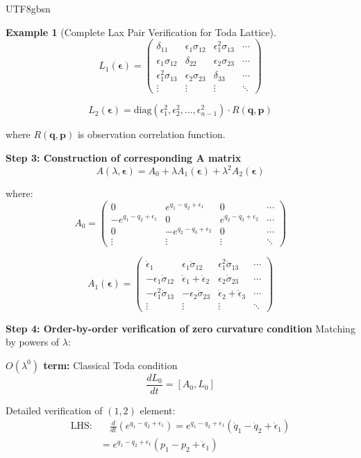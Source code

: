 \documentclass[a4paper,12pt]{extarticle}
\theoremstyle{definition}
\newtheorem{example}{Example}
\begin{document}
\begin{CJK}{UTF8}{gbsn}
\begin{example}[Complete Lax Pair Verification for Toda Lattice]
$$L_1(\boldsymbol{\epsilon}) = \begin{pmatrix}
\delta_{11} & \epsilon_1\sigma_{12} & \epsilon_1^2\sigma_{13} & \cdots \\
\epsilon_1\sigma_{12} & \delta_{22} & \epsilon_2\sigma_{23} & \cdots \\
\epsilon_1^2\sigma_{13} & \epsilon_2\sigma_{23} & \delta_{33} & \cdots \\
\vdots & \vdots & \vdots & \ddots
\end{pmatrix}$$

$$L_2(\boldsymbol{\epsilon}) = \text{diag}(\epsilon_1^2, \epsilon_2^2, \ldots, \epsilon_{n-1}^2) \cdot R(\boldsymbol{q}, \boldsymbol{p})$$

where $R(\boldsymbol{q}, \boldsymbol{p})$ is observation correlation function.

\textbf{Step 3: Construction of corresponding A matrix}
$$A(\lambda, \boldsymbol{\epsilon}) = A_0 + \lambda A_1(\boldsymbol{\epsilon}) + \lambda^2 A_2(\boldsymbol{\epsilon})$$

where:
$$A_0 = \begin{pmatrix}
0 & e^{q_1-q_2+\epsilon_1} & 0 & \cdots \\
-e^{q_1-q_2+\epsilon_1} & 0 & e^{q_2-q_3+\epsilon_2} & \cdots \\
0 & -e^{q_2-q_3+\epsilon_2} & 0 & \cdots \\
\vdots & \vdots & \vdots & \ddots
\end{pmatrix}$$

$$A_1(\boldsymbol{\epsilon}) = \begin{pmatrix}
\dot{\epsilon}_1 & \epsilon_1\dot{\sigma}_{12} & \epsilon_1^2\dot{\sigma}_{13} & \cdots \\
-\epsilon_1\dot{\sigma}_{12} & \dot{\epsilon}_1 + \dot{\epsilon}_2 & \epsilon_2\dot{\sigma}_{23} & \cdots \\
-\epsilon_1^2\dot{\sigma}_{13} & -\epsilon_2\dot{\sigma}_{23} & \dot{\epsilon}_2 + \dot{\epsilon}_3 & \cdots \\
\vdots & \vdots & \vdots & \ddots
\end{pmatrix}$$

\textbf{Step 4: Order-by-order verification of zero curvature condition}
Matching by powers of $\lambda$:

\textbf{$O(\lambda^0)$ term:} Classical Toda condition
$$\frac{dL_0}{dt} = [A_0, L_0]$$

Detailed verification of $(1,2)$ element:
\begin{align*}
\text{LHS}: &\quad \frac{d}{dt}(e^{q_1-q_2+\epsilon_1}) = e^{q_1-q_2+\epsilon_1}(\dot{q}_1 - \dot{q}_2 + \dot{\epsilon}_1) \\
&= e^{q_1-q_2+\epsilon_1}(p_1 - p_2 + \dot{\epsilon}_1)
\end{align*}


\end{example}
\end{CJK}
\end{document}
